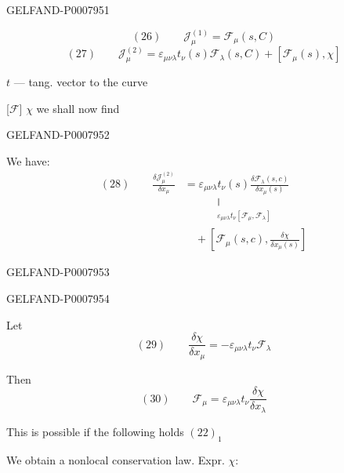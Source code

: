 \begin{GelfandAdjacentEvidence}{GELFAND-P000795}{1}

\[
(26)\qquad\mathcal{J}^{(1)}_\mu=\mathcal{F}_\mu(s,C)
\]
\[
(27)\qquad\mathcal{J}^{(2)}_\mu=
\varepsilon_{\mu\nu\lambda}t_\nu(s)\mathcal{F}_\lambda(s,C)
+[\mathcal{F}_\mu(s),\chi]
\]

\(t\) --- tang. vector to the curve

[\sout{\(\mathcal F\)}] \(\chi\) we shall now find
\end{GelfandAdjacentEvidence}
\begin{GelfandAdjacentEvidence}{GELFAND-P000795}{2}


We have:
\[
\begin{aligned}
(28)\qquad
\frac{\delta\mathcal{J}^{(2)}_\mu}{\delta x_\mu}
&=\underset{\substack{\Vert\\
\displaystyle\varepsilon_{\mu\nu\lambda}t_\nu[\mathcal{F}_\mu,\mathcal{F}_\lambda]}}
{\varepsilon_{\mu\nu\lambda}t_\nu(s)
\frac{\delta\mathcal{F}_\lambda(s,c)}{\delta x_\mu(s)}}\\[1ex]
&\quad+\left[\mathcal{F}_\mu(s,c),\frac{\delta\chi}{\delta x_\mu(s)}\right]
\end{aligned}
\]
\end{GelfandAdjacentEvidence}
\begin{GelfandAdjacentEvidence}{GELFAND-P000795}{3}

\end{GelfandAdjacentEvidence}
\begin{GelfandAdjacentEvidence}{GELFAND-P000795}{4}


Let
\[
(29)\qquad \frac{\delta\chi}{\delta x_\mu}=
-\varepsilon_{\mu\nu\lambda}t_\nu\mathcal{F}_\lambda
\]

Then
\[
(30)\qquad\mathcal{F}_\mu=\varepsilon_{\mu\nu\lambda}t_\nu
\frac{\delta\chi}{\delta x_\lambda}
\]

This is possible if the following holds \((22)_1\)

We obtain a nonlocal conservation law. \quad Expr. \(\chi\):
\end{GelfandAdjacentEvidence}
